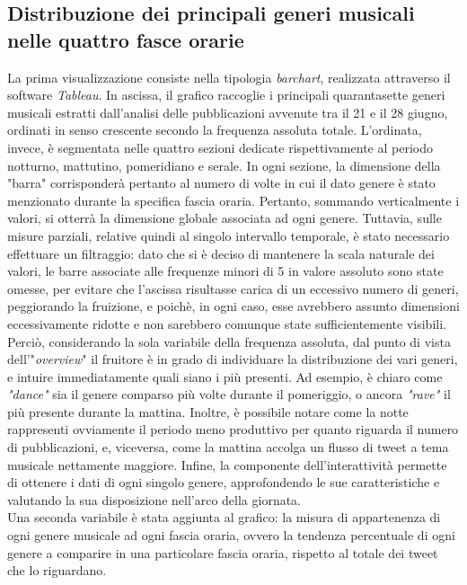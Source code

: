 \documentclass[12pt, a4paper, twocolumn]{article} %
\begin{document}
\subsection{Distribuzione dei principali generi musicali nelle quattro fasce orarie}
La prima visualizzazione consiste nella tipologia \textit{barchart}, realizzata attraverso il software \textit{Tableau}. In ascissa, il grafico raccoglie i principali quarantasette generi musicali estratti dall'analisi delle pubblicazioni avvenute tra il 21 e il 28 giugno, ordinati in senso crescente secondo la frequenza assoluta totale. 
L'ordinata, invece, è segmentata nelle quattro sezioni dedicate rispettivamente al periodo notturno, mattutino, pomeridiano e serale. 
In ogni sezione, la dimensione della "barra" corrisponderà pertanto al numero di volte in cui il dato genere è stato menzionato durante la specifica fascia oraria. Pertanto, sommando verticalmente i valori, si otterrà la dimensione globale associata ad ogni genere. 
Tuttavia, sulle misure parziali, relative quindi al singolo intervallo temporale, è stato necessario effettuare un filtraggio: dato che si è deciso di mantenere la scala naturale dei valori, le barre associate alle frequenze minori di 5 in valore assoluto sono state omesse, per evitare che l'ascissa risultasse carica di un eccessivo numero di generi, peggiorando la fruizione, e poichè, in ogni caso, esse avrebbero assunto dimensioni eccessivamente ridotte e non sarebbero comunque state sufficientemente visibili.\\
Perciò, considerando la sola variabile della frequenza assoluta, dal punto di vista dell'"\textit{overview}" il fruitore è in grado di individuare la distribuzione dei vari generi, e intuire immediatamente quali siano i più presenti. 
Ad esempio, è chiaro come \textit{"dance"} sia il genere comparso più volte durante il pomeriggio, o ancora \textit{"rave"} il più presente durante la mattina. 
Inoltre, è possibile notare come la notte rappresenti ovviamente il periodo meno produttivo per quanto riguarda il numero di pubblicazioni, e, viceversa, come la mattina accolga un flusso di tweet a tema musicale nettamente maggiore. 
Infine, la componente dell'interattività permette di ottenere i dati di ogni singolo genere, approfondendo le sue caratteristiche e valutando la sua disposizione nell'arco della giornata.\\
Una seconda variabile è stata aggiunta al grafico: la misura di appartenenza di ogni genere musicale ad ogni fascia oraria, ovvero la tendenza percentuale di ogni genere a comparire in una particolare fascia oraria, rispetto al totale dei tweet che lo riguardano. 
\end{document}
